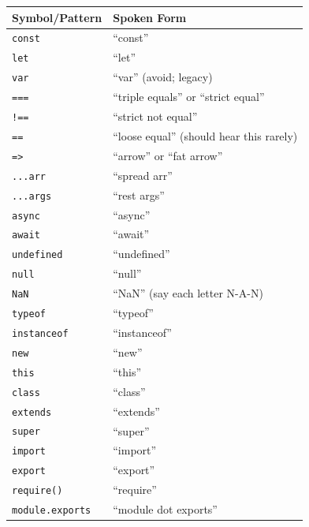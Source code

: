 \documentclass[
  justified,
  openright,
]{tufte-book}
\begin{document}
\begin{fullwidth}{\def\LTcaptype{none} %
\begin{longtable}[]{@{}
  >{\raggedright\arraybackslash}p{}
  >{\raggedright\arraybackslash}p{}@{}}
\toprule\noalign{}
\begin{minipage}[b]{\linewidth}\raggedright
Symbol/Pattern
\end{minipage} & \begin{minipage}[b]{\linewidth}\raggedright
Spoken Form
\end{minipage} \\
\midrule\noalign{}
\endhead
\bottomrule\noalign{}
\endlastfoot
\texttt{const} & ``const'' \\
\texttt{let} & ``let'' \\
\texttt{var} & ``var'' (avoid; legacy) \\
\texttt{===} & ``triple equals'' or ``strict equal'' \\
\texttt{!==} & ``strict not equal'' \\
\texttt{==} & ``loose equal'' (should hear this rarely) \\
\texttt{=\textgreater{}} & ``arrow'' or ``fat arrow'' \\
\texttt{...arr} & ``spread arr'' \\
\texttt{...args} & ``rest args'' \\
\texttt{async} & ``async'' \\
\texttt{await} & ``await'' \\
\texttt{undefined} & ``undefined'' \\
\texttt{null} & ``null'' \\
\texttt{NaN} & ``NaN'' (say each letter N-A-N) \\
\texttt{typeof} & ``typeof'' \\
\texttt{instanceof} & ``instanceof'' \\
\texttt{new} & ``new'' \\
\texttt{this} & ``this'' \\
\texttt{class} & ``class'' \\
\texttt{extends} & ``extends'' \\
\texttt{super} & ``super'' \\
\texttt{import} & ``import'' \\
\texttt{export} & ``export'' \\
\texttt{require()} & ``require'' \\
\texttt{module.exports} & ``module dot exports'' \\

\end{longtable}}
\end{fullwidth}
\end{document}
